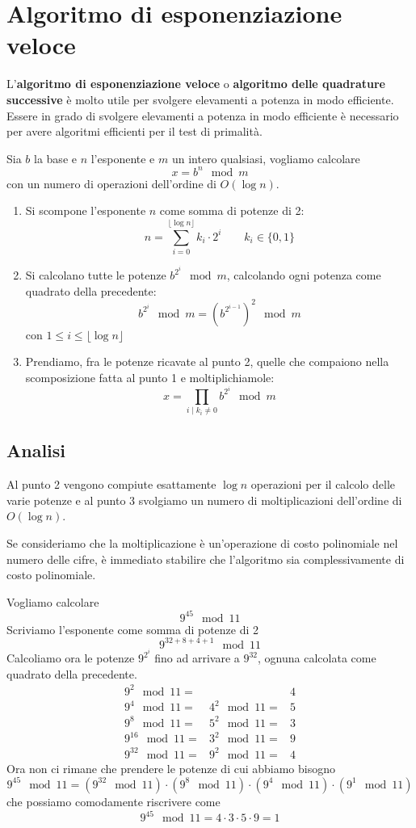 \section{Algoritmo di esponenziazione veloce}\label{esponenziazione}
L'\textbf{algoritmo di esponenziazione veloce} o \textbf{algoritmo delle quadrature successive} \`e molto utile per
svolgere elevamenti a potenza in modo efficiente. Essere in grado di svolgere elevamenti a potenza in modo efficiente
\`e necessario per avere algoritmi efficienti per il test di primalit\`a.

Sia $b$ la base e $n$ l'esponente e $m$ un intero qualsiasi, vogliamo calcolare
\[ x = b^n \mod{m} \]
con un numero di operazioni dell'ordine di $O(\log n)$.
\begin{enumerate}
	\item Si scompone l'esponente $n$ come somma di potenze di 2:
	      \[ n = \sum_{i=0}^{\lfloor \log n \rfloor} k_i \cdot 2^i \quad \quad k_i \in \{0,1\} \]
	\item Si calcolano tutte le potenze $b^{2^i} \mod{m}$, calcolando ogni potenza come quadrato della precedente:
	      \[ b^{2^i} \mod{m} = \left( b^{2^{i-1}} \right)^2 \mod{m} \]
	      con $1 \leq i \leq \lfloor \log n \rfloor$
	\item Prendiamo, fra le potenze ricavate al punto 2, quelle che compaiono nella scomposizione fatta al
	      punto 1 e moltiplichiamole:
	      \[ x = \prod_{i \mid k_i \neq 0} b^{2^i} \mod{m} \]
\end{enumerate}

\subsection{Analisi}
Al punto 2 vengono compiute esattamente $\log n$ operazioni per il calcolo delle varie potenze e al punto 3 svolgiamo
un numero di moltiplicazioni dell'ordine di $O(\log n)$.

Se consideriamo che la moltiplicazione \`e un'operazione di costo polinomiale nel numero delle cifre, \`e immediato
stabilire che l'algoritmo sia complessivamente di costo polinomiale.

\begin{example}
	Vogliamo calcolare
	\[ 9^{45} \mod{11} \]
	Scriviamo l'esponente come somma di potenze di 2
	\[ 9^{32 + 8 + 4 + 1} \mod{11} \]
	Calcoliamo ora le potenze $9^{2^i}$ fino ad arrivare a $9^{32}$, ognuna calcolata come quadrato della precedente.
	\[
		\begin{matrix}
			9^2 \mod{11} =    &                & 4 \\
			9^4 \mod{11} =    & 4^2 \mod{11} = & 5 \\
			9^8 \mod{11} =    & 5^2 \mod{11} = & 3 \\
			9^{16} \mod{11} = & 3^2 \mod{11} = & 9 \\
			9^{32} \mod{11} = & 9^2 \mod{11} = & 4
		\end{matrix}
	\]
	Ora non ci rimane che prendere le potenze di cui abbiamo bisogno
	\[ 9^{45} \mod{11} = (9^{32} \mod{11}) \cdot (9^8 \mod{11}) \cdot (9^4 \mod{11}) \cdot (9^1 \mod{11}) \]
	che possiamo comodamente riscrivere come
	\[ 9^{45} \mod{11} = 4 \cdot 3 \cdot 5 \cdot 9 = 1 \]
\end{example}

